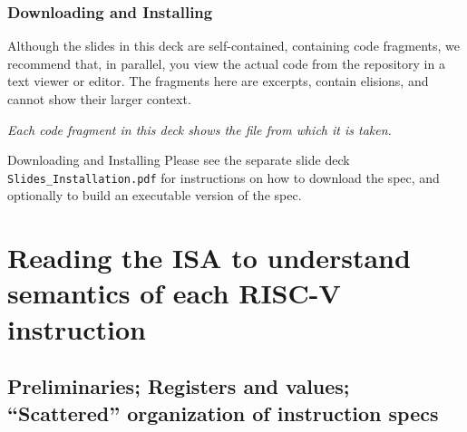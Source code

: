 \documentclass[aspectratio=169]{beamer}
\begin{document}
\begin{frame}
  \frametitle{Downloading and Installing}

  Although the slides in this deck are self-contained, containing code
  fragments, we recommend that, in parallel, you view the actual code
  from the repository in a text viewer or editor.  The fragments here
  are excerpts, contain elisions, and cannot show their larger
  context.

  \vspace{1ex}

  {\footnotesize \emph{Each code fragment in this deck shows the file from which it is taken.}}

  \vspace{1ex}

  \begin{block}{Downloading and Installing}
    Please see the separate slide deck {\tt Slides\_Installation.pdf}
    for instructions on how to download the spec, and optionally to
    build an executable version of the spec.
  \end{block}

\end{frame}



\section{Reading the ISA to understand semantics of each RISC-V instruction}

\label{sec_reading}


\subsection{Preliminaries; Registers and values; ``Scattered'' organization of instruction specs}

\end{document}
